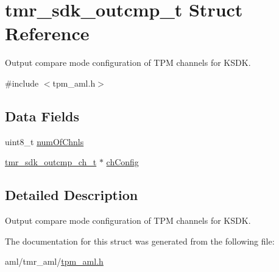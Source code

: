 \hypertarget{structtmr__sdk__outcmp__t}{}\section{tmr\+\_\+sdk\+\_\+outcmp\+\_\+t Struct Reference}
\label{structtmr__sdk__outcmp__t}


Output compare mode configuration of T\+PM channels for K\+S\+DK.  




{\ttfamily \#include $<$tpm\+\_\+aml.\+h$>$}

\subsection*{Data Fields}
\begin{DoxyCompactItemize}
\item 
uint8\+\_\+t \mbox{\hyperlink{group__struct__group_ga04fc2b7b992637ebdbf5567107730087}{num\+Of\+Chnls}}
\item 
\mbox{\hyperlink{structtmr__sdk__outcmp__ch__t}{tmr\+\_\+sdk\+\_\+outcmp\+\_\+ch\+\_\+t}} $\ast$ \mbox{\hyperlink{group__struct__group_ga5757dff16c6d1f7f36e57e4c9cf0ddbf}{ch\+Config}}
\end{DoxyCompactItemize}


\subsection{Detailed Description}
Output compare mode configuration of T\+PM channels for K\+S\+DK. 

The documentation for this struct was generated from the following file\+:\begin{DoxyCompactItemize}
\item 
aml/tmr\+\_\+aml/\mbox{\hyperlink{tpm__aml_8h}{tpm\+\_\+aml.\+h}}\end{DoxyCompactItemize}
